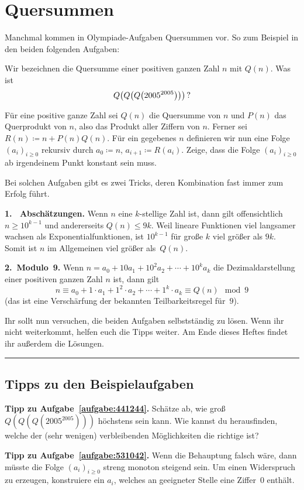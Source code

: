 \section{Quersummen}\label{kapitel:Quersummen}
Manchmal kommen in Olympiade-Aufgaben Quersummen vor. So zum Beispiel in den beiden folgenden Aufgaben:
\begin{aufgabe*}\label{aufgabe:441244}
	Wir bezeichnen die Quersumme einer positiven ganzen Zahl $n$ mit $Q(n)$. Was ist
	\begin{equation*}
		Q\parens*{Q\parens*{Q\parens*{2005^{2005}}}}\,?
	\end{equation*}
\end{aufgabe*}
\begin{aufgabe*}\label{aufgabe:531042}
	Für eine positive ganze Zahl sei $Q(n)$ die Quersumme von $n$ und $P(n)$ das Querprodukt von $n$, also das Produkt aller Ziffern von $n$. Ferner sei $R(n)\coloneqq n+P(n)Q(n)$. Für ein gegebenes $n$ definieren wir nun eine Folge $(a_i)_{i\geqslant 0}$ rekursiv durch $a_0\coloneqq n$, $a_{i+1}\coloneqq R(a_i)$. Zeige, dass die Folge $(a_i)_{i\geqslant 0}$ ab irgendeinem Punkt konstant sein muss.
\end{aufgabe*}

Bei solchen Aufgaben gibt es zwei Tricks, deren Kombination fast immer zum Erfolg führt.

\textbf{1. ~Abschätzungen.} Wenn $n$ eine $k$-stellige Zahl ist, dann gilt offensichtlich $n\geqslant 10^{k-1}$ und andererseits $Q(n)\leqslant 9k$. Weil lineare Funktionen viel langsamer wachsen als Exponentialfunktionen, ist $10^{k-1}$ für große $k$ viel größer als $9k$. Somit ist $n$ im Allgemeinen viel größer als~$Q(n)$.

\textbf{2.~Modulo~9.} Wenn $n=a_0+10a_1+10^2a_2+\dotsb+10^ka_k$ die Dezimaldarstellung einer positiven ganzen Zahl $n$ ist, dann gilt
\begin{equation*}
	n\equiv a_0+1\cdot a_1+1^2\cdot a_2+\dotsb+1^k\cdot a_k\equiv Q(n)\mod 9
\end{equation*}
(das ist eine Verschärfung der bekannten Teilbarkeitsregel für~$9$).

Ihr sollt nun versuchen, die beiden Aufgaben selbstständig zu lösen. Wenn ihr nicht weiterkommt, helfen euch die Tipps weiter. Am Ende dieses Heftes findet ihr außerdem die Lösungen.

\vfill\hrule\vspace{-1em}

\subsection*{Tipps zu den Beispielaufgaben}

\textbf{Tipp zu Aufgabe~\ref{aufgabe:441244}.} Schätze ab, wie groß $Q(Q(Q(2005^{2005})))$ höchstens sein kann. Wie kannst du herausfinden, welche der (sehr wenigen) verbleibenden Möglichkeiten die richtige ist?

\textbf{Tipp zu Aufgabe~\ref{aufgabe:531042}.} Wenn die Behauptung falsch wäre, dann müsste die Folge $(a_i)_{i\geqslant 0}$ streng monoton steigend sein. Um einen Widerspruch zu erzeugen, konstruiere ein $a_i$, welches an geeigneter Stelle eine Ziffer~$0$ enthält.